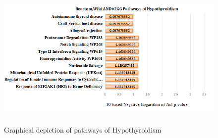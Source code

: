 \begin{figure}[H]
\centering
\includegraphics[height=7cm]{./fig/fig4_4.png} 
\centering
\caption{Graphical depiction of   pathways of Hypothyroidism}
\label{Significant_pathways_hypothyroidism}
\end{figure}

\newpage

